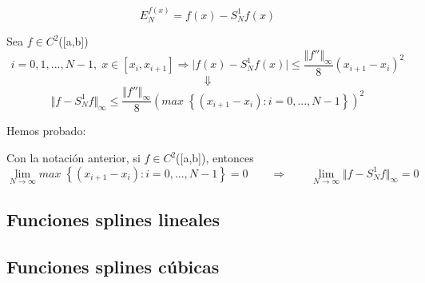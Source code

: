 \begin{ndef}
\[ E_N^{f(x)} = f(x) - S_N^1f(x) \]
\end{ndef}

Sea $f \in C^2$([a,b])
\[ i=0,1,...,N-1, \; x \in \left[ x_i,x_{i+1} \right] \Rightarrow \vert f(x) - S_N^1f(x) \vert \leq \frac{\Vert f'' \Vert _\infty}{8}(x_{i+1}-x_i)^2 \]
\[ \Downarrow \]
\[ \Vert f-S_N^1f \Vert _\infty \leq \frac{\Vert f'' \Vert _\infty}{8} \left( max \; \left\lbrace (x_{i+1}-x_i):i=0,...,N-1 \right\rbrace \right) ^2 \]

Hemos probado:

\begin{nprop}
Con la notación anterior, si $f \in C^2$([a,b]), entonces
\[ \lim_{N\rightarrow \infty} max \; \left\lbrace (x_{i+1}-x_i):i=0,...,N-1 \right\rbrace = 0 \qquad \Rightarrow \qquad \lim_{N \rightarrow \infty} \Vert f - S_N^1f \Vert _\infty = 0 \]
\end{nprop}
\subsection{Funciones splines lineales}

\subsection{Funciones splines cúbicas}
